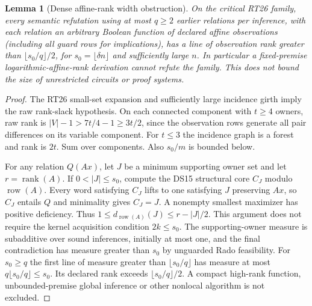 \documentclass[11pt]{article}
\newtheorem{lemma}[theorem]{Lemma}
\begin{document}
\begin{lemma}[Dense affine-rank width obstruction]\label{lem:do21-width}
On the critical RT26 family, every semantic refutation using at most $q\ge2$ earlier relations per inference, with each relation an arbitrary Boolean function of declared affine observations (including all guard rows for implications), has a line of observation rank greater than $\lfloor s_0/q\rfloor/2$, for $s_0=\lfloor\delta n\rfloor$ and sufficiently large $n$. In particular a fixed-premise logarithmic-affine-rank derivation cannot refute the family. This does not bound the size of unrestricted circuits or proof systems.
\end{lemma}
\begin{proof}
The RT26 small-set expansion and sufficiently large incidence girth imply the raw rank-slack hypothesis. On each connected component with $t\ge4$ owners, raw rank is $|V|-1>7t/4-1\ge3t/2$, since the observation rows generate all pair differences on its variable component. For $t\le3$ the incidence graph is a forest and rank is $2t$. Sum over components. Also $s_0/m$ is bounded below.

For any relation $Q(Ax)$, let $J$ be a minimum supporting owner set and let $r=\operatorname{rank}(A)$. If $0<|J|\le s_0$, compute the DS15 structural core $C_J$ modulo $\operatorname{row}(A)$. Every word satisfying $C_J$ lifts to one satisfying $J$ preserving $Ax$, so $C_J$ entails $Q$ and minimality gives $C_J=J$. A nonempty smallest maximizer has positive deficiency. Thus $1\le d_{\operatorname{row}(A)}(J)\le r-|J|/2$. This argument does not require the kernel acquisition condition $2k\le s_0$. The supporting-owner measure is subadditive over sound inferences, initially at most one, and the final contradiction has measure greater than $s_0$ by unguarded Rado feasibility. For $s_0\ge q$ the first line of measure greater than $\lfloor s_0/q\rfloor$ has measure at most $q\lfloor s_0/q\rfloor\le s_0$. Its declared rank exceeds $\lfloor s_0/q\rfloor/2$. A compact high-rank function, unbounded-premise global inference or other nonlocal algorithm is not excluded.
\end{proof}
\end{document}
